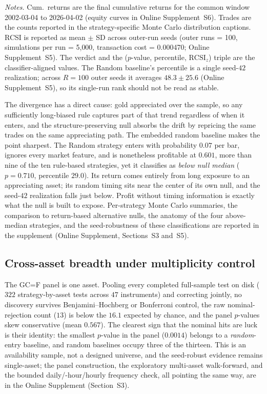 \documentclass[risks,article,submit,pdftex,oneauthor]{Definitions/mdpi}
\begin{document}
\begin{table}[t]
\begin{minipage}{0.95\textwidth}
\centering
\footnotesize\emph{Notes.} Cum.\ returns are the final cumulative returns for the common window 2002-03-04 to 2026-04-02 (equity curves in Online Supplement~S6). Trades are the counts reported in the strategy-specific Monte Carlo distribution captions. RCSI is reported as mean $\pm$ SD across outer-run seeds (outer runs = 100, simulations per run = 5{,}000, transaction cost = 0.000470; Online Supplement~S5). The verdict and the ($p$-value, percentile, $\mathrm{RCSI}_z$) triple are the classifier-aligned values. The Random baseline's percentile is a single seed-$42$ realization; across $R=100$ outer seeds it averages $48.3\pm25.6$ (Online Supplement~S5), so its single-run rank should not be read as stable.
\end{minipage}
\end{table}

The divergence has a direct cause: gold appreciated over the sample, so any sufficiently long-biased rule captures part of that trend regardless of when it enters, and the structure-preserving null absorbs the drift by repricing the same trades on the same appreciating path. The embedded random baseline makes the point sharpest. The Random strategy enters with probability $0.07$ per bar, ignores every market feature, and is nonetheless profitable at $0.601$, more than nine of the ten rule-based strategies, yet it classifies as \emph{below null median} ($p=0.710$, percentile $29.0$). Its return comes entirely from long exposure to an appreciating asset; its random timing sits near the center of its own null, and the seed-$42$ realization falls just below. Profit without timing information is exactly what the null is built to expose. Per-strategy Monte Carlo summaries, the comparison to return-based alternative nulls, the anatomy of the four above-median strategies, and the seed-robustness of these classifications are reported in the supplement (Online Supplement, Sections~S3 and~S5).

\subsection{Cross-asset breadth under multiplicity control}
\label{sec:cross-asset-multiplicity}

The GC=F panel is one asset. Pooling every completed full-sample test on disk ($322$ strategy-by-asset tests across $47$ instruments) and correcting jointly, no discovery survives Benjamini--Hochberg or Bonferroni control, the raw nominal-rejection count ($13$) is below the $16.1$ expected by chance, and the panel $p$-values skew conservative (mean $0.567$). The clearest sign that the nominal hits are luck is their identity: the smallest $p$-value in the panel ($0.0014$) belongs to a \emph{random}-entry baseline, and random baselines occupy three of the thirteen. This is an availability sample, not a designed universe, and the seed-robust evidence remains single-asset; the panel construction, the exploratory multi-asset walk-forward, and the bounded daily/-hour/\allowbreak hourly frequency check, all pointing the same way, are in the Online Supplement (Section~S3).
\end{document}
